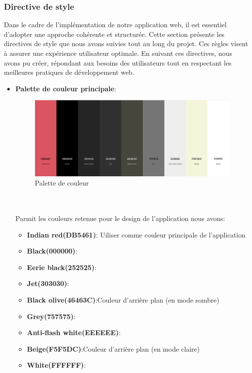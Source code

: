 \documentclass[a4paper,12pt]{report}
\begin{document}
\subsubsection{Directive de style}
Dans le cadre de l'implémentation de notre application web, il est essentiel d'adopter une approche cohérente et structurée. Cette section présente les directives de style que nous avons suivies tout au long du projet. Ces règles visent à assurer une expérience utilisateur optimale. En suivant ces directives, nous avons pu créer, répondant aux besoins des utilisateurs tout en respectant les meilleures pratiques de développement web.
\begin{itemize}
  \item\textbf{Palette de couleur principale}:
  \begin{figure}[h!]
    \includegraphics[width=1\textwidth]{./images/getdo-color-palette.png}
    \caption{Palette de couleur}
    \label{fig:jira_project_task}
  \end{figure}\\ \\
 Parmit les couleurs retenue pour le design de l'application nous avons:
  \begin{itemize}
    \item\textbf{Indian red(DB5461)}: Uiliser comme couleur principale de l'application
    \item\textbf{Black(000000)}:
    \item\textbf{Eerie black(252525)}:
    \item\textbf{Jet(303030)}:
    \item\textbf{Black olive(46463C)}:Couleur d'arrière plan (en mode sombre)
    \item\textbf{Grey(757575)}:
    \item\textbf{Anti-flash white(EEEEEE)}:
    \item\textbf{Beige(F5F5DC)}:Couleur d'arrière plan (en mode claire)
    \item\textbf{White(FFFFFF)}:
  \end{itemize}
  
\end{itemize}
\end{document}
